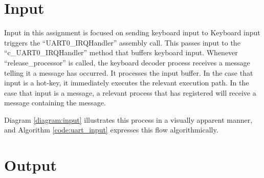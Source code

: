 \documentclass[12pt]{report}
\begin{document}
\section{Input}
    Input in this assignment is focused on sending keyboard input to
    Keyboard input triggers the ``UART0\_IRQHandler'' assembly call. This
    passes input to the ``c\_UART0\_IRQHandler'' method that buffers keyboard
    input. Whenever ``release\_processor'' is called, the keyboard decoder
    process receives a message telling it a message has occurred. It processes
    the input buffer. In the case that input is a hot-key, it immediately
    executes the relevant execution path. In the case that input is a message, a
    relevant process that has registered will receive a message containing the
    message.

    Diagram \ref{diagram:input} illustrates this process in a visually
    apparent manner, and Algorithm \ref{code:uart_input} expresses this flow
    algorithmically.

    \section{Output}
\end{document}
